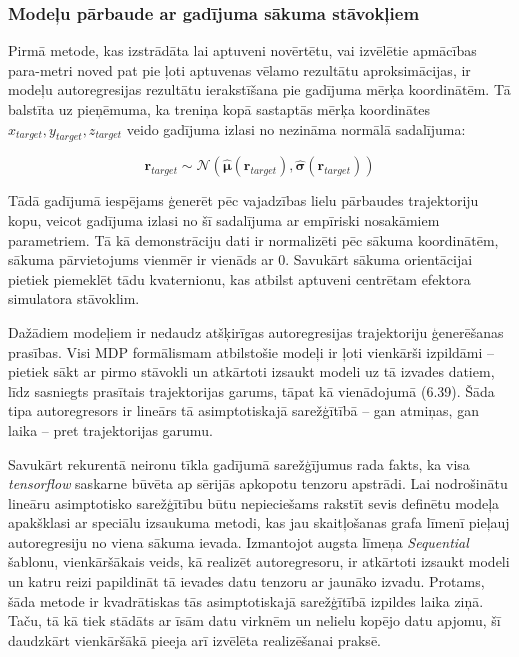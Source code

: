 \documentclass[12pt, a4paper]{article}
\numberwithin{equation}{section} %
\begin{document}
\subsubsection{Modeļu pārbaude ar gadījuma sākuma stāvokļiem}

Pirmā metode, kas izstrādāta lai aptuveni novērtētu, vai izvēlētie apmācības para-metri noved pat pie ļoti aptuvenas vēlamo rezultātu aproksimācijas, ir modeļu autoregresijas rezultātu ierakstīšana pie gadījuma mērķa koordinātēm. Tā balstīta uz pieņēmuma, ka treniņa kopā sastaptās mērķa koordinātes $x_{target}, y_{target}, z_{target}$ veido gadījuma izlasi no nezināma normālā sadalījuma:

\begin{equation}
    \mathbf{r}_{target} \sim \mathcal{N}(\hat{\boldsymbol{\mu}}(\mathbf{r}_{target}), \hat{\boldsymbol{\sigma}}(\mathbf{r}_{target}))
\end{equation}

Tādā gadījumā iespējams ģenerēt pēc vajadzības lielu pārbaudes trajektoriju kopu, veicot gadījuma izlasi no šī sadalījuma ar empīriski nosakāmiem parametriem. Tā kā demonstrāciju dati ir normalizēti pēc sākuma koordinātēm, sākuma pārvietojums vienmēr ir vienāds ar 0. Savukārt sākuma orientācijai pietiek piemeklēt tādu kvaternionu, kas atbilst aptuveni centrētam efektora simulatora stāvoklim.

Dažādiem modeļiem ir nedaudz atšķirīgas autoregresijas trajektoriju ģenerēšanas prasības. Visi MDP formālismam atbilstošie modeļi ir ļoti vienkārši izpildāmi -- pietiek sākt ar pirmo stāvokli un atkārtoti izsaukt modeli uz tā izvades datiem, līdz sasniegts prasītais trajektorijas garums, tāpat kā vienādojumā (6.39). Šāda tipa autoregresors ir lineārs tā asimptotiskajā sarežģītībā -- gan atmiņas, gan laika -- pret trajektorijas garumu. 

Savukārt rekurentā neironu tīkla gadījumā sarežģījumus rada fakts, ka visa \textit{tensorflow} saskarne būvēta ap sērijās apkopotu tenzoru apstrādi. Lai nodrošinātu lineāru asimptotisko sarežģītību būtu nepieciešams rakstīt sevis definētu modeļa apakšklasi ar speciālu izsaukuma metodi, kas jau skaitļošanas grafa līmenī pieļauj autoregresiju no viena sākuma ievada. Izmantojot augsta līmeņa \textit{Sequential} šablonu, vienkāršākais veids, kā realizēt autoregresoru, ir atkārtoti izsaukt modeli un katru reizi papildināt tā ievades datu tenzoru ar jaunāko izvadu. Protams, šāda metode ir kvadrātiskas tās asimptotiskajā sarežģītībā izpildes laika ziņā. Taču, tā kā tiek stādāts ar īsām datu virknēm un nelielu kopējo datu apjomu, šī daudzkārt vienkāršākā pieeja arī izvēlēta realizēšanai praksē.
\end{document}
